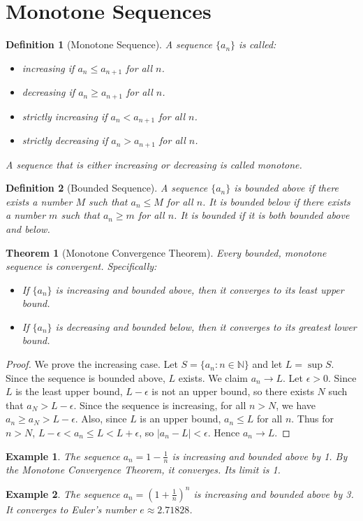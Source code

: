 \documentclass[11pt,a4paper]{article}
\newtheorem{example}{Example}
\newtheorem{theorem}{Theorem}
\newtheorem{definition}{Definition}
\begin{document}
\section{Monotone Sequences}
\begin{definition}[Monotone Sequence]
A sequence $\{a_n\}$ is called:
\begin{itemize}
\item \textit{increasing} if $a_n \leq a_{n+1}$ for all $n$.
\item \textit{decreasing} if $a_n \geq a_{n+1}$ for all $n$.
\item \textit{strictly increasing} if $a_n < a_{n+1}$ for all $n$.
\item \textit{strictly decreasing} if $a_n > a_{n+1}$ for all $n$.
\end{itemize}
A sequence that is either increasing or decreasing is called \textit{monotone}.
\end{definition}
\begin{definition}[Bounded Sequence]
A sequence $\{a_n\}$ is \textit{bounded above} if there exists a number $M$ such that $a_n \leq M$ for all $n$. It is \textit{bounded below} if there exists a number $m$ such that $a_n \geq m$ for all $n$. It is \textit{bounded} if it is both bounded above and below.
\end{definition}
\begin{theorem}[Monotone Convergence Theorem]
Every bounded, monotone sequence is convergent. Specifically:
\begin{itemize}
\item If $\{a_n\}$ is increasing and bounded above, then it converges to its least upper bound.
\item If $\{a_n\}$ is decreasing and bounded below, then it converges to its greatest lower bound.
\end{itemize}
\end{theorem}
\begin{proof}
We prove the increasing case. Let $S = \{a_n : n \in \mathbb{N}\}$ and let $L = \sup S$. Since the sequence is bounded above, $L$ exists. We claim $a_n \to L$. Let $\epsilon > 0$. Since $L$ is the least upper bound, $L - \epsilon$ is not an upper bound, so there exists $N$ such that $a_N > L - \epsilon$. Since the sequence is increasing, for all $n > N$, we have $a_n \geq a_N > L - \epsilon$. Also, since $L$ is an upper bound, $a_n \leq L$ for all $n$. Thus for $n > N$, $L - \epsilon < a_n \leq L < L + \epsilon$, so $|a_n - L| < \epsilon$. Hence $a_n \to L$.
\end{proof}
\begin{example}
The sequence $a_n = 1 - \frac{1}{n}$ is increasing and bounded above by 1. By the Monotone Convergence Theorem, it converges. Its limit is 1.
\end{example}
\begin{example}
The sequence $a_n = \left(1 + \frac{1}{n}\right)^n$ is increasing and bounded above by 3. It converges to Euler's number $e \approx 2.71828$.
\end{example}
\end{document}
